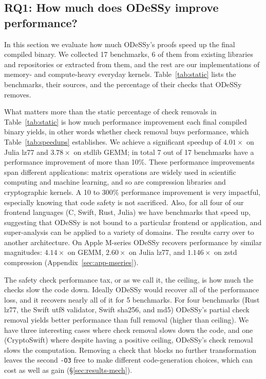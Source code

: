 \documentclass[acmsmall,screen,nonacm]{acmart}
\newcommand{\odessy}{ODeSSy}
\newcommand{\tool}{\odessy}
\begin{document}
\subsection{RQ1: How much does \tool{} improve performance?}
\label{sec:results-perf}
\label{sec:results-static}

In this section we evaluate how much \tool{}'s proofs speed up the final compiled binary. We collected 17 benchmarks, 6 of them from existing libraries and repositories or extracted from them, and the rest are our implementations of memory- and compute-heavy everyday kernels. Table~\ref{tab:static} lists the benchmarks, their sources, and the percentage of their checks that \tool{} removes. 

What matters more than the static percentage of check removals in Table~\ref{tab:static} is how much performance improvement each final compiled binary yields, in other words whether check removal buys performance, which Table~\ref{tab:speedups} establishes. We achieve a significant speedup of $4.01\times$ on Julia lz77
and $3.78\times$ on stdlib GEMM; in total 7 out of 17 benchmarks have a performance improvement of more than 10\%. These performance improvements span different applications: matrix operations are widely used in scientific computing and machine learning, and so are compression libraries and cryptographic kernels. A 10 to 300\% performance improvement is very impactful, especially knowing that code safety is not sacrificed. Also, for all four of our frontend languages (C, Swift, Rust, Julia) we have benchmarks that speed up, suggesting that \tool{} is not bound to a particular frontend or application, and super-analysis can be applied to a variety of domains. The results carry over to another architecture. On Apple M-series \tool{} recovers performance by similar magnitudes: $4.14\times$ on GEMM, $2.60\times$ on Julia lz77, and $1.146\times$ on zstd compression (Appendix~\ref{sec:app-mseries}).


The safety check performance tax, or as we call it, the ceiling, is how much the checks slow the code down. Ideally \tool{} would recover all of the performance loss, and it recovers nearly all of it for 5 benchmarks. For four benchmarks (Rust lz77, the Swift utf8 validator, Swift sha256, and md5) \tool{}'s partial check removal yields better performance than full removal (higher than ceiling). We have three interesting cases where check removal slows down the code, and one (CryptoSwift) where despite having a positive ceiling, \tool{}'s check removal slows the computation. Removing a check that blocks no further transformation leaves the second \texttt{-O3} free to make different code-generation choices, which can cost as well as gain (\S\ref{sec:results-mech}).
\end{document}
